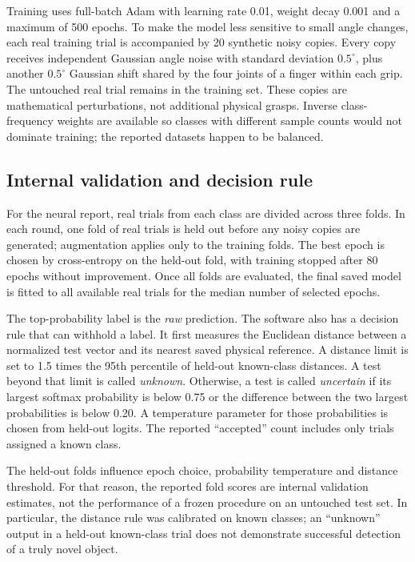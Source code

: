 \documentclass[12pt,a4paper]{article}
\begin{document}
Training uses full-batch Adam with learning rate 0.01, weight decay 0.001 and a maximum of 500 epochs. To make the model less sensitive to small angle changes, each real training trial is accompanied by 20 synthetic noisy copies. Every copy receives independent Gaussian angle noise with standard deviation $0.5^\circ$, plus another $0.5^\circ$ Gaussian shift shared by the four joints of a finger within each grip. The untouched real trial remains in the training set. These copies are mathematical perturbations, not additional physical grasps. Inverse class-frequency weights are available so classes with different sample counts would not dominate training; the reported datasets happen to be balanced.

\subsection{Internal validation and decision rule}

For the neural report, real trials from each class are divided across three folds. In each round, one fold of real trials is held out before any noisy copies are generated; augmentation applies only to the training folds. The best epoch is chosen by cross-entropy on the held-out fold, with training stopped after 80 epochs without improvement. Once all folds are evaluated, the final saved model is fitted to all available real trials for the median number of selected epochs.

The top-probability label is the \emph{raw} prediction. The software also has a decision rule that can withhold a label. It first measures the Euclidean distance between a normalized test vector and its nearest saved physical reference. A distance limit is set to 1.5 times the 95th percentile of held-out known-class distances. A test beyond that limit is called \emph{unknown}. Otherwise, a test is called \emph{uncertain} if its largest softmax probability is below 0.75 or the difference between the two largest probabilities is below 0.20. A temperature parameter for those probabilities is chosen from held-out logits. The reported ``accepted'' count includes only trials assigned a known class.

The held-out folds influence epoch choice, probability temperature and distance threshold. For that reason, the reported fold scores are internal validation estimates, not the performance of a frozen procedure on an untouched test set. In particular, the distance rule was calibrated on known classes; an ``unknown'' output in a held-out known-class trial does not demonstrate successful detection of a truly novel object.
\end{document}
